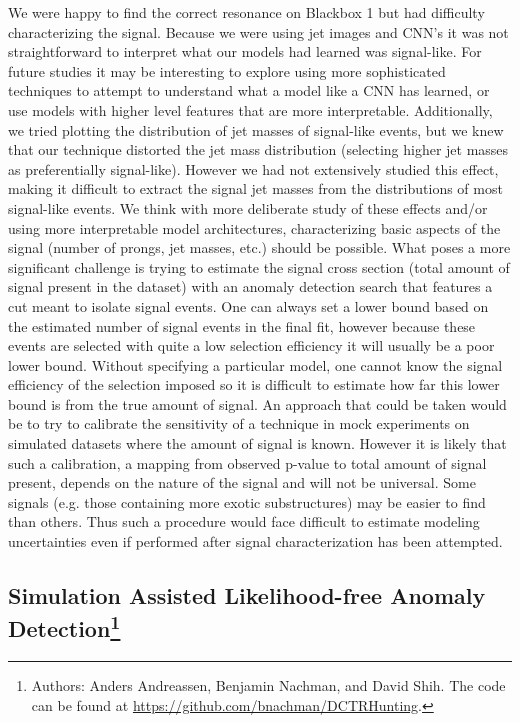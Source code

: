\documentclass[a4paper,11pt]{article}
\begin{document}
We were happy to find the correct resonance on Blackbox 1 but had difficulty characterizing the signal. 
Because we were using jet images and CNN's it was not straightforward to interpret what our models had learned was signal-like. 
For future studies it may be interesting to explore using more sophisticated techniques to attempt to understand what a model like a CNN has learned, or use models with higher level features
that are more interpretable. 
Additionally, we tried plotting the distribution of jet masses of signal-like events, but we knew that our technique distorted the jet mass distribution (selecting higher jet masses as preferentially signal-like).
However we had not extensively studied this effect, making it difficult to extract the signal jet masses from the distributions of most signal-like events.
We think with more deliberate study of these effects and/or using more interpretable model architectures, 
characterizing basic aspects of the signal (number of prongs, jet masses, etc.) should be possible.
What poses a more significant challenge is trying to estimate the signal cross section (total amount of signal present in the dataset) with an anomaly detection search that features
a cut meant to isolate signal events. 
One can always set a lower bound based on the estimated number of signal events in the final fit, however because these events are selected with quite a low selection efficiency it will usually be a
poor lower bound. 
Without specifying a particular model, one cannot know the signal efficiency of the selection imposed so it is difficult to estimate how far this lower bound is from the true amount of signal. 
An approach that could be taken would be to try to calibrate the sensitivity of a technique in mock experiments on simulated datasets where the amount of signal is known. 
However it is likely that such a calibration, a mapping from observed p-value to total amount of signal present, depends on the nature of the signal and will not be universal. 
Some signals (e.g. those containing more exotic substructures) may be easier to find than others. 
Thus such a procedure would face difficult to estimate modeling uncertainties even if performed after signal characterization has been attempted. 


 \FloatBarrier
\subsection[Simulation Assisted Likelihood-free Anomaly Detection]{Simulation Assisted Likelihood-free Anomaly Detection\footnote{Authors: Anders Andreassen, Benjamin Nachman, and David Shih.  The code can be found at \url{https://github.com/bnachman/DCTRHunting}.}}
\end{document}
